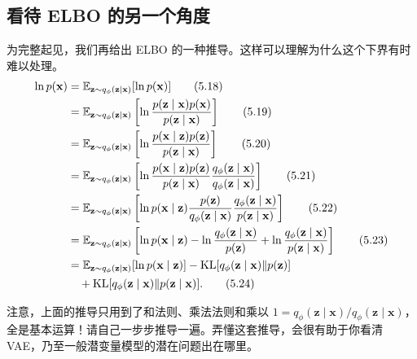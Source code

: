 \subsection{看待 ELBO 的另一个角度}
为完整起见，我们再给出 ELBO 的一种推导。这样可以理解为什么这个下界有时难以处理。
\begin{align}
\ln p(\mathbf{x})&=\mathbb{E}_{\mathbf{z}\sim q_\phi(\mathbf{z}\mid\mathbf{x})}[\ln p(\mathbf{x})] \tag{5.18}\label{eq:05-18}\\
 &=\mathbb{E}_{\mathbf{z}\sim q_\phi(\mathbf{z}\mid\mathbf{x})}
       \left[\ln\frac{p(\mathbf{z}\mid\mathbf{x})p(\mathbf{x})}{p(\mathbf{z}\mid\mathbf{x})}\right] \tag{5.19}\label{eq:05-19}\\
 &=\mathbb{E}_{\mathbf{z}\sim q_\phi(\mathbf{z}\mid\mathbf{x})}
       \left[\ln\frac{p(\mathbf{x}\mid\mathbf{z})p(\mathbf{z})}{p(\mathbf{z}\mid\mathbf{x})}\right] \tag{5.20}\label{eq:05-20}\\
 &=\mathbb{E}_{\mathbf{z}\sim q_\phi(\mathbf{z}\mid\mathbf{x})}
       \left[\ln\frac{p(\mathbf{x}\mid\mathbf{z})p(\mathbf{z})}{p(\mathbf{z}\mid\mathbf{x})}
           \frac{q_\phi(\mathbf{z}\mid\mathbf{x})}{q_\phi(\mathbf{z}\mid\mathbf{x})}\right] \tag{5.21}\label{eq:05-21}\\
 &=\mathbb{E}_{\mathbf{z}\sim q_\phi(\mathbf{z}\mid\mathbf{x})}
       \left[\ln p(\mathbf{x}\mid\mathbf{z})\frac{p(\mathbf{z})}{q_\phi(\mathbf{z}\mid\mathbf{x})}
           \frac{q_\phi(\mathbf{z}\mid\mathbf{x})}{p(\mathbf{z}\mid\mathbf{x})}\right] \tag{5.22}\label{eq:05-22}\\
 &=\mathbb{E}_{\mathbf{z}\sim q_\phi(\mathbf{z}\mid\mathbf{x})}
       \left[\ln p(\mathbf{x}\mid\mathbf{z})-\ln\frac{q_\phi(\mathbf{z}\mid\mathbf{x})}{p(\mathbf{z})}
          +\ln\frac{q_\phi(\mathbf{z}\mid\mathbf{x})}{p(\mathbf{z}\mid\mathbf{x})}\right] \tag{5.23}\label{eq:05-23}\\
 &=\mathbb{E}_{\mathbf{z}\sim q_\phi(\mathbf{z}\mid\mathbf{x})}[\ln p(\mathbf{x}\mid\mathbf{z})]
       -\mathrm{KL}[q_\phi(\mathbf{z}\mid\mathbf{x})\|p(\mathbf{z})]\notag\\
 &\quad+\mathrm{KL}[q_\phi(\mathbf{z}\mid\mathbf{x})\|p(\mathbf{z}\mid\mathbf{x})]. \tag{5.24}\label{eq:05-24}
\end{align}

注意，上面的推导只用到了和法则、乘法法则和乘以 $1=q_\phi(\mathbf{z}\mid\mathbf{x})/q_\phi(\mathbf{z}\mid\mathbf{x})$，全是基本运算！请自己一步步推导一遍。弄懂这套推导，会很有助于你看清 VAE，乃至一般潜变量模型的潜在问题出在哪里。

